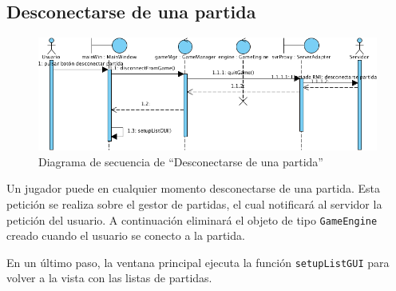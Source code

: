 \subsection{Desconectarse de una partida}

\begin{figure}[ht]
\centering
\includegraphics[scale=0.6]{img/ch03devel-exitgame.png}
\caption{Diagrama de secuencia de ``Desconectarse de una partida''}
\end{figure}

Un jugador puede en cualquier momento desconectarse de una partida. Esta
petición se realiza sobre el gestor de partidas, el cual notificará al servidor
la petición del usuario. A continuación eliminará el objeto de tipo
\texttt{GameEngine} creado cuando el usuario se conecto a la partida.

En un último paso, la ventana principal ejecuta la función
\texttt{setupListGUI} para volver a la vista con las listas de partidas.
